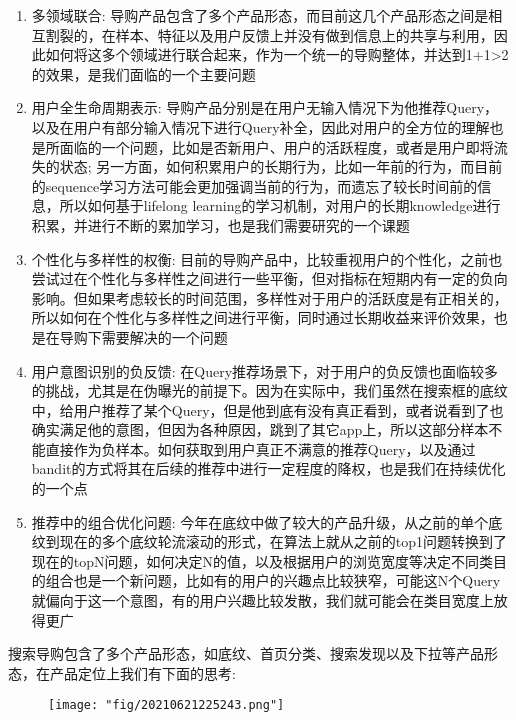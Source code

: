 \begin{enumerate}
	\item 多领域联合: 导购产品包含了多个产品形态，而目前这几个产品形态之间是相互割裂的，在样本、特征以及用户反馈上并没有做到信息上的共享与利用，因此如何将这多个领域进行联合起来，作为一个统一的导购整体，并达到1+1>2的效果，是我们面临的一个主要问题

	\item 用户全生命周期表示: 导购产品分别是在用户无输入情况下为他推荐Query，以及在用户有部分输入情况下进行Query补全，因此对用户的全方位的理解也是所面临的一个问题，比如是否新用户、用户的活跃程度，或者是用户即将流失的状态; 另一方面，如何积累用户的长期行为，比如一年前的行为，而目前的sequence学习方法可能会更加强调当前的行为，而遗忘了较长时间前的信息，所以如何基于lifelong learning的学习机制，对用户的长期knowledge进行积累，并进行不断的累加学习，也是我们需要研究的一个课题

	\item 个性化与多样性的权衡: 目前的导购产品中，比较重视用户的个性化，之前也尝试过在个性化与多样性之间进行一些平衡，但对指标在短期内有一定的负向影响。但如果考虑较长的时间范围，多样性对于用户的活跃度是有正相关的，所以如何在个性化与多样性之间进行平衡，同时通过长期收益来评价效果，也是在导购下需要解决的一个问题

	\item 用户意图识别的负反馈: 在Query推荐场景下，对于用户的负反馈也面临较多的挑战，尤其是在伪曝光的前提下。因为在实际中，我们虽然在搜索框的底纹中，给用户推荐了某个Query，但是他到底有没有真正看到，或者说看到了也确实满足他的意图，但因为各种原因，跳到了其它app上，所以这部分样本不能直接作为负样本。如何获取到用户真正不满意的推荐Query，以及通过bandit的方式将其在后续的推荐中进行一定程度的降权，也是我们在持续优化的一个点

	\item 推荐中的组合优化问题: 今年在底纹中做了较大的产品升级，从之前的单个底纹到现在的多个底纹轮流滚动的形式，在算法上就从之前的top1问题转换到了现在的topN问题，如何决定N的值，以及根据用户的浏览宽度等决定不同类目的组合也是一个新问题，比如有的用户的兴趣点比较狭窄，可能这N个Query就偏向于这一个意图，有的用户兴趣比较发散，我们就可能会在类目宽度上放得更广

\end{enumerate}

搜索导购包含了多个产品形态，如底纹、首页分类、搜索发现以及下拉等产品形态，在产品定位上我们有下面的思考: 

\begin{figure}[!h]
	\centering
	\texttt{[image: "fig/20210621225243.png"]}
	\caption{}
	\label{fig:20210621225243}
\end{figure}

